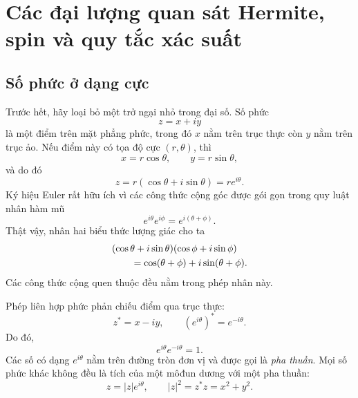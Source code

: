 \chapter{Các đại lượng quan sát Hermite, spin và quy tắc xác suất}


\section{Số phức ở dạng cực}

Trước hết, hãy loại bỏ một trở ngại nhỏ trong đại số. Số phức
\begin{equation}
  z=x+iy
\end{equation}
là một điểm trên mặt phẳng phức, trong đó \(x\) nằm trên trục thực còn \(y\) nằm trên trục ảo. Nếu điểm này có tọa độ cực \((r,\theta)\), thì
\begin{equation}
  x=r\cos\theta,
  \qquad
  y=r\sin\theta,
\end{equation}
và do đó
\begin{equation}
  z=r(\cos\theta+i\sin\theta)=re^{i\theta}.
  \label{eq:l03-polar-form}
\end{equation}
Ký hiệu Euler rất hữu ích vì các công thức cộng góc được gói gọn trong quy luật nhân hàm mũ
\begin{equation}
  e^{i\theta}e^{i\phi}
  =e^{i(\theta+\phi)}.
  \label{eq:l03-phase-product}
\end{equation}
Thật vậy, nhân hai biểu thức lượng giác cho ta
\begin{align}
& (\cos\theta+i\sin\theta)(\cos\phi+i\sin\phi)
\notag\\
&\qquad=\cos(\theta+\phi)+i\sin(\theta+\phi).
\end{align}
Các công thức cộng quen thuộc đều nằm trong phép nhân này.

Phép liên hợp phức phản chiếu điểm qua trục thực:
\begin{equation}
  z^*=x-iy,
  \qquad
  (e^{i\theta})^*=e^{-i\theta}.
\end{equation}
Do đó,
\begin{equation}
  e^{i\theta}e^{-i\theta}=1.
\end{equation}
Các số có dạng \(e^{i\theta}\) nằm trên đường tròn đơn vị và được gọi là \emph{pha thuần}. Mọi số phức khác không đều là tích của một môđun dương với một pha thuần:
\begin{equation}
  z=|z|e^{i\theta},
  \qquad
  |z|^2=z^*z=x^2+y^2.
  \label{eq:l03-modulus-phase}
\end{equation}

